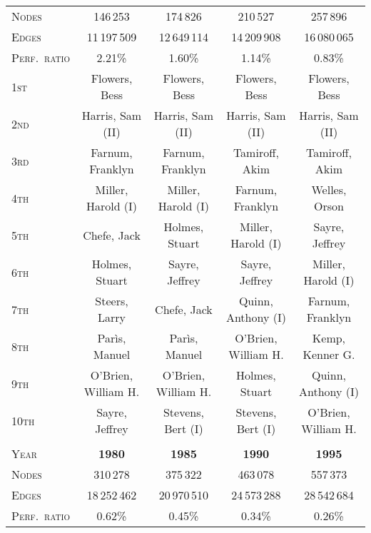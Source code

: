 \documentclass{acm_proc_article-sp}
\begin{document}
\begin{small}
\begin{table*}[b]
\begin{tabular}{|l|c|c|c|c|}
\textsc{Nodes} & 146\,253 & 174\,826 & 210\,527 & 257\,896\\ 
\textsc{Edges} & 11\,197\,509 & 12\,649\,114 & 14\,209\,908 & 16\,080\,065\\ 
\textsc{Perf.~ratio} & 2.21\% & 1.60\% & 1.14\% & 0.83\%\\ 
\hline
\textsc{1st} &               Flowers, Bess  &               Flowers, Bess  &               Flowers, Bess  &               Flowers, Bess \\ 
\textsc{2nd} &            Harris, Sam (II)  &            Harris, Sam (II)  &            Harris, Sam (II)  &            Harris, Sam (II) \\ 
\textsc{3rd} &            Farnum, Franklyn  &            Farnum, Franklyn  &              Tamiroff, Akim  &              Tamiroff, Akim \\ 
\textsc{4th} &          Miller, Harold (I)  &          Miller, Harold (I)  &            Farnum, Franklyn  &               Welles, Orson \\ 
\textsc{5th} &                 Chefe, Jack  &              Holmes, Stuart  &          Miller, Harold (I)  &              Sayre, Jeffrey \\ 
\textsc{6th} &              Holmes, Stuart  &              Sayre, Jeffrey  &              Sayre, Jeffrey  &          Miller, Harold (I) \\ 
\textsc{7th} &               Steers, Larry  &                 Chefe, Jack  &          Quinn, Anthony (I)  &            Farnum, Franklyn \\ 
\textsc{8th} &               Par\`is, Manuel  &               Par\`is, Manuel  &         O'Brien, William H.  &             Kemp, Kenner G. \\ 
\textsc{9th} &         O'Brien, William H.  &         O'Brien, William H.  &              Holmes, Stuart  &          Quinn, Anthony (I) \\ 
\textsc{10th} &               Sayre, Jeffrey  &            Stevens, Bert (I)  &            Stevens, Bert (I)  &          O'Brien, William H. \\ 
\hline
\multicolumn{5}{c}{} \\ 
\hline
\textsc{Year} & \textbf{1980} & \textbf{1985} & \textbf{1990} & \textbf{1995}\\ 
\textsc{Nodes} & 310\,278 & 375\,322 & 463\,078 & 557\,373\\ 
\textsc{Edges} & 18\,252\,462 & 20\,970\,510 & 24\,573\,288 & 28\,542\,684\\ 
\textsc{Perf.~ratio} & 0.62\% & 0.45\% & 0.34\% & 0.26\%\\ 

\end{tabular}
\end{table*}
\end{small}
\end{document}
